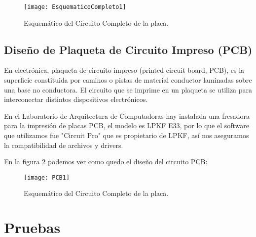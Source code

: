 \begin{figure}[H]
\centering
  \texttt{[image: EsquematicoCompleto1]}
  \caption{Esquemático del Circuito Completo de la placa.}\label{fig:EsquematicoCompleto1}
\end{figure}



\subsection{Diseño de Plaqueta de Circuito Impreso (PCB)}
\label{pcb1}

En electrónica, plaqueta de circuito impreso (printed circuit board, PCB), es la superficie constituida por caminos o pistas de material conductor laminadas sobre una base no conductora. El circuito que se imprime en un plaqueta se utiliza para interconectar distintos dispositivos electrónicos.

En el Laboratorio de Arquitectura de Computadoras hay instalada una fresadora para la impresión de placas PCB, el modelo es LPKF E33, por lo que el software que utilizamos fue "Circuit Pro" que es propietario de LPKF, así nos aseguramos la compatibilidad de archivos y drivers.

En la figura \ref{fig:PCB1} podemos ver como quedo el diseño del circuito PCB:

\begin{figure}
\centering
  \texttt{[image: PCB1]}
  \caption{Esquemático del Circuito Completo de la placa.}\label{fig:PCB1}
\end{figure}




\clearpage


\section{Pruebas} %
\label{it3:sec:pruebas}


